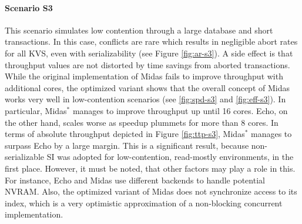 
\paragraph{Scenario S3}

This scenario simulates low contention through a large database and short
transactions. In this case, conflicts are rare which results in negligible abort
rates for all KVS, even with serializability (see Figure \ref{fig:ar-s3}). A
side effect is that throughput values are not distorted by time savings from
aborted transactions. While the original implementation of Midas fails to
improve throughput with additional cores, the optimized variant shows that the
overall concept of Midas works very well in low-contention scenarios (see
\ref{fig:spd-s3} and \ref{fig:eff-s3}). In particular, Midas$^{*}$ manages to
improve throughput up until 16 cores. Echo, on the other hand, scales worse as
speedup plummets for more than 8 cores. In terms of absolute throughput depicted
in Figure \ref{fig:ttp-s3}, Midas$^{*}$ manages to surpass Echo by a large
margin. This is a significant result, because non-serializable SI was adopted
for low-contention, read-mostly environments, in the first place. However, it
must be noted, that other factors may play a role in this. For instance, Echo
and Midas use different backends to handle potential NVRAM. Also, the optimized
variant of Midas does not synchronize access to its index, which is a very
optimistic approximation of a non-blocking concurrent implementation.

